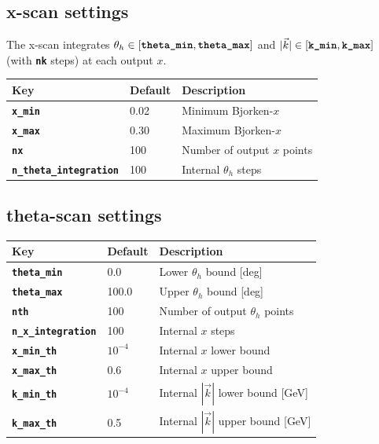 \documentclass[11pt,a4paper]{article}
\newcommand{\inikey}[1]{\texttt{\textbf{#1}}}
\begin{document}
\subsection{x-scan settings}

The x-scan integrates $\theta_h\in[\inikey{theta\_min},\inikey{theta\_max}]$
and $|\vec{k}|\in[\inikey{k\_min},\inikey{k\_max}]$ (with \inikey{nk} steps)
at each output $x$.

\begin{center}
\begin{tabular}{lll}
\toprule
\textbf{Key} & \textbf{Default} & \textbf{Description} \\
\midrule
\inikey{x\_min}               & 0.02  & Minimum Bjorken-$x$ \\
\inikey{x\_max}               & 0.30  & Maximum Bjorken-$x$ \\
\inikey{nx}                   & 100   & Number of output $x$ points \\
\inikey{n\_theta\_integration} & 100  & Internal $\theta_h$ steps \\
\bottomrule
\end{tabular}
\end{center}

\subsection{theta-scan settings}

\begin{center}
\begin{tabular}{lll}
\toprule
\textbf{Key} & \textbf{Default} & \textbf{Description} \\
\midrule
\inikey{theta\_min}     & 0.0   & Lower $\theta_h$ bound [deg] \\
\inikey{theta\_max}     & 100.0 & Upper $\theta_h$ bound [deg] \\
\inikey{nth}            & 100   & Number of output $\theta_h$ points \\
\inikey{n\_x\_integration} & 100 & Internal $x$ steps \\
\inikey{x\_min\_th}     & $10^{-4}$ & Internal $x$ lower bound \\
\inikey{x\_max\_th}     & 0.6   & Internal $x$ upper bound \\
\inikey{k\_min\_th}     & $10^{-4}$ & Internal $|\vec{k}|$ lower bound [GeV] \\
\inikey{k\_max\_th}     & 0.5   & Internal $|\vec{k}|$ upper bound [GeV] \\
\bottomrule
\end{tabular}
\end{center}
\end{document}
